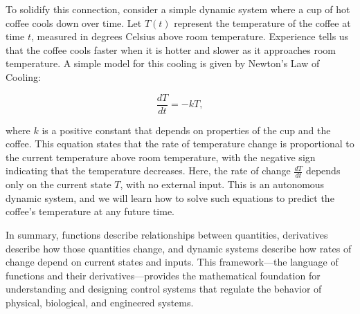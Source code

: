 To solidify this connection, consider a simple dynamic system where a cup of hot coffee cools down over time. Let $T(t)$ represent the temperature of the coffee at time $t$, measured in degrees Celsius above room temperature. Experience tells us that the coffee cools faster when it is hotter and slower as it approaches room temperature. A simple model for this cooling is given by Newton's Law of Cooling:

\[
\frac{dT}{dt} = -kT,
\]

where $k$ is a positive constant that depends on properties of the cup and the coffee. This equation states that the rate of temperature change is proportional to the current temperature above room temperature, with the negative sign indicating that the temperature decreases. Here, the rate of change $\frac{dT}{dt}$ depends only on the current state $T$, with no external input. This is an autonomous dynamic system, and we will learn how to solve such equations to predict the coffee's temperature at any future time.

In summary, functions describe relationships between quantities, derivatives describe how those quantities change, and dynamic systems describe how rates of change depend on current states and inputs. This framework—the language of functions and their derivatives—provides the mathematical foundation for understanding and designing control systems that regulate the behavior of physical, biological, and engineered systems.
